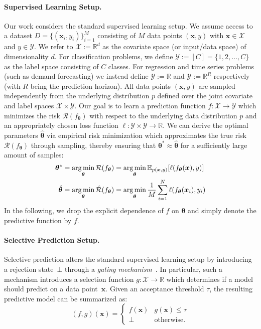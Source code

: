 \paragraph{Supervised Learning Setup.} Our work considers the standard supervised learning setup. We assume access to a dataset $D = \{(\bm{x}_i,y_i)\}_{i=1}^{M}$ consisting of $M$ data points $(\bm{x},y)$ with $\bm{x} \in \mathcal{X}$ and  $y \in \mathcal{Y}$. We refer to $\mathcal{X} := \mathbb{R}^d$ as the covariate space (or input/data space) of dimensionality $d$. For classification problems, we define $\mathcal{Y} := [C] = \{1, 2, \ldots, C\}$ as the label space consisting of $C$ classes. For regression and time series problems (such as demand forecasting) we instead define $\mathcal{Y} := \mathbb{R}$ and $\mathcal{Y} := \mathbb{R}^R$ respectively (with $R$ being the prediction horizon). All data points $(\bm{x},y)$ are sampled independently from the underlying distribution $p$ defined over the joint covariate and label spaces $\mathcal{X} \times \mathcal{Y}$. Our goal is to learn a prediction function $f : \mathcal{X} \rightarrow \mathcal{Y}$ which minimizes the risk $\mathcal{R}(f_{\bm{\theta}})$ with respect to the underlying data distribution $p$ and an appropriately chosen loss function $\ell : \mathcal{Y} \times \mathcal{Y} \rightarrow \mathbb{R}$. 
We can derive the optimal parameters $\hat{\bm{\theta}}$ via empirical risk minimization which approximates the true risk $\mathcal{R}(f_{\bm{\theta}})$ through sampling, thereby ensuring that $\bm{\theta}^* \approx \hat{\bm{\theta}}$ for a sufficiently large amount of samples:
\begin{align}
    \bm{\theta}^* & = \operatorname*{arg\,min}_{\bm{\theta}} \mathcal{R}(f_{\bm{\theta}}) = \operatorname*{arg\,min}_{\bm{\theta}} \mathbb{E}_{p(\bm{x},y)}[\ell(f_{\bm{\theta}}(\bm{x}),y)] \\ 
    \hat{\bm{\theta}} & = \operatorname*{arg\,min}_{\bm{\theta}} \hat{\mathcal{R}}(f_{\bm{\theta}}) = \operatorname*{arg\,min}_{\bm{\theta}} \frac{1}{M} \sum_{i=1}^{N} \ell(f_{\bm{\theta}}(\bm{x}_i),y_i)
\end{align}
In the following, we drop the explicit dependence of $f$ on $\bm{\theta}$ and simply denote the predictive function by $f$.

\paragraph{Selective Prediction Setup.} Selective prediction alters the standard supervised learning setup by introducing a rejection state~$\bot$ through a \textit{gating mechanism}~\citep{yaniv2010riskcoveragecurve}. In particular, such a mechanism introduces a selection function $g:\mathcal{X} \rightarrow \mathbb{R}$ which determines if a model should predict on a data point~$\bm{x}$. 
Given an acceptance threshold $\tau$, the resulting predictive model can be summarized as:
\begin{equation}
    (f,g)(\bm{x}) = \begin{cases}
  f(\bm{x})  & g(\bm{x}) \leq \tau \\
  \bot & \text{otherwise.}
\end{cases}
\end{equation}

